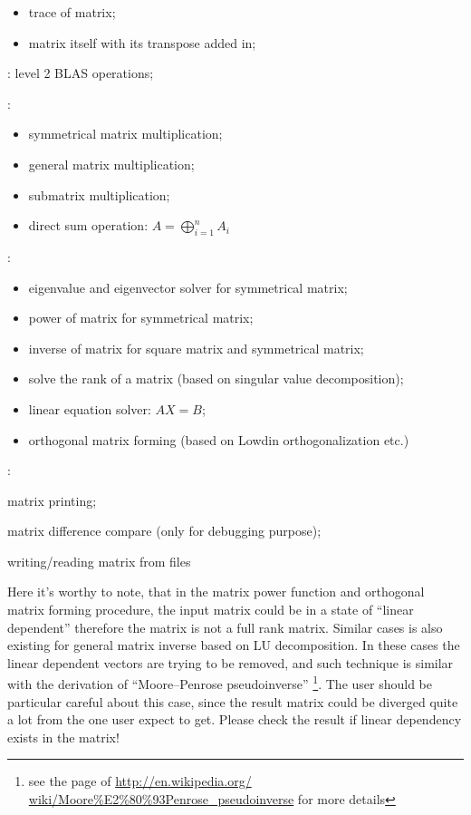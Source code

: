 \begin{description}
\begin{itemize}
  \item trace of matrix;
  \item matrix itself with its transpose added in;
 \end{itemize}
 \item [vector and matrix operations]: level 2 BLAS operations;
 \item [matrix and matrix operations]:
 \begin{itemize}
  \item symmetrical matrix multiplication;
  \item general matrix multiplication;
  \item submatrix multiplication;
  \item direct sum operation: $A = \bigoplus^{n}_{i=1}A_{i}$ 
 \end{itemize}
 \item [LAPACK functions]:
 \begin{itemize}
  \item eigenvalue and eigenvector solver for symmetrical matrix;
  \item power of matrix for symmetrical matrix;
  \item inverse of matrix for square matrix and symmetrical matrix;
  \item solve the rank of a matrix (based on singular value decomposition);
  \item linear equation solver: $AX = B$;
  \item orthogonal matrix forming (based on Lowdin orthogonalization etc.)
 \end{itemize}
 \item [other matrix utilities]:
  \item matrix printing;
  \item matrix difference compare (only for debugging purpose);
  \item writing/reading matrix from files
\end{description}

Here it's worthy to note, that in the matrix power function and orthogonal 
matrix forming procedure, the input matrix could be in a state of ``linear
dependent'' therefore the matrix is not a full rank matrix. Similar cases 
is also existing for general matrix inverse based on LU decomposition. 
In these cases the linear dependent vectors are trying to be removed, and 
such technique is similar with the derivation of ``Moore–Penrose pseudoinverse''
\footnote{ see the page of \url{http://en.wikipedia.org/
wiki/Moore\%E2\%80\%93Penrose_pseudoinverse} for more details}. The user should 
be particular careful about this case, since the result matrix could be diverged 
quite a lot from the one user expect to get. Please check the result if linear
dependency exists in the matrix!

